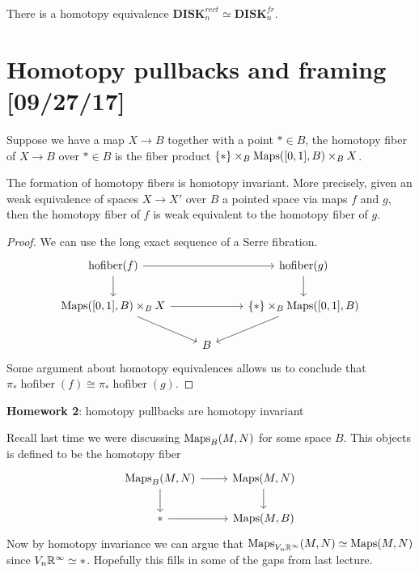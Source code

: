 \documentclass{amsart}
\DeclareMathOperator{\hofiber}{hofiber}
\begin{document}
\begin{proposition}
    There is a homotopy equivalence $\mathbf{DISK}_n^{rect}\simeq \mathbf{DISK}_n^{fr}$.
\end{proposition}


\section{Homotopy pullbacks and framing [09/27/17]}

\begin{definition}
    Suppose we have a map $X\to B$ together with a point $*\in B$, the homotopy fiber
    of $X\to B$ over $*\in B$ is the fiber product $\{*\}\times_B\operatorname{Maps}([0,1], B)\times_B X$.
\end{definition}

\begin{lemma}
    The formation of homotopy fibers is homotopy invariant. More precisely, given an weak
    equivalence of spaces $X\to X'$ over $B$ a pointed space via maps $f$ and $g$,
    then the homotopy fiber of $f$ is weak equivalent to the homotopy fiber of $g$.
\end{lemma}
\begin{proof}
    We can use the long exact sequence of a Serre fibration.
    \begin{equation*}
        \begin{tikzcd}
            \hofiber(f)\dar \ar[rr] & \; & \hofiber(g)\dar \\
            \Maps([0,1],B)\times_B X \ar[rr]\drar & \; & \{*\}\times_B\Maps([0,1],B)\ar[dl] \\
            \; & B & 
        \end{tikzcd}
    \end{equation*}
    Some argument about homotopy equivalences allows us to conclude that $\pi_*\hofiber(f)\cong\pi_*\hofiber(g)$.
\end{proof}


\textbf{Homework 2}: homotopy pullbacks are homotopy invariant

Recall last time we were discussing $\operatorname{Maps}_B(M,N)$ for some space $B$. This objects
is defined to be the homotopy fiber
\begin{equation*}
    \begin{tikzcd}
        \Maps_B(M,N) \rar\dar & \Maps(M,N) \dar \\
        * \rar & \Maps(M,B)
    \end{tikzcd}
\end{equation*}
Now by homotopy invariance we can argue that $\operatorname{Maps}_{V_n\mathbb{R}^\infty}(M,N)\simeq \operatorname{Maps}(M,N)$
since $V_n\mathbb{R}^\infty\simeq*$. Hopefully this fills in some of the gaps from last lecture.
\end{document}
